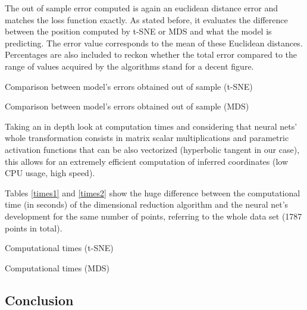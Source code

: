 \documentclass[a4paper,11pt,spanish]{report}
\begin{document}
The out of sample error computed is again an euclidean distance error and matches the loss function exactly. As stated before, it evaluates the difference between the position computed by t-SNE or MDS and what the model is predicting. The error value corresponds to the mean of these Euclidean distances. Percentages are also included to reckon whether the total error compared to the range of values acquired by the algorithms stand for a decent figure.

\begin{table}[h]
\vspace{20px}
\centering

\caption{\label{metrics1}Comparison between model's errors obtained out of sample (t-SNE)}
\end{table}

\begin{table}[h]
\vspace{20px}
\centering

\caption{\label{metrics2}Comparison between model's errors obtained out of sample (MDS)}
\end{table}

Taking an in depth look at computation times and considering that neural nets' whole transformation consists in matrix scalar multiplications and parametric activation functions that can be also vectorized (hyperbolic tangent in our case), this allows for an extremely efficient computation of inferred coordinates (low CPU usage, high speed).

Tables \ref{times1} and \ref{times2} show the huge difference between the computational time (in seconds) of the dimensional reduction algorithm and the neural net's development for the same number of points, referring to the whole data set (1787 points in total).

\begin{table}[h]
\vspace{10px}
\centering

\caption{\label{times1}Computational times (t-SNE)}
\end{table}

\begin{table}[h]
\vspace{10px}
\centering

\caption{\label{times2}Computational times (MDS)}
\end{table}

\subsection{Conclusion}
\label{ssec:conc1}
\end{document}
